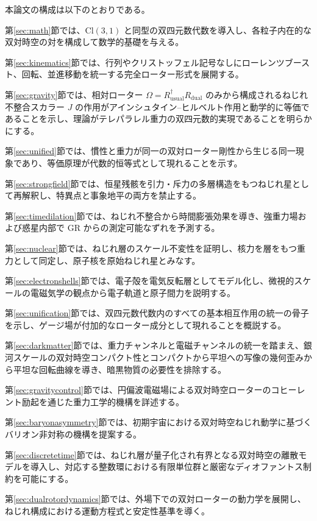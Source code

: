 \documentclass[dvipdfmx,a4paper]{article}
\begin{document}
本論文の構成は以下のとおりである。

第\ref{sec:math}節では、$\mathrm{Cl}(3,1)$ と同型の双四元数代数を導入し、各粒子内在的な双対時空の対を構成して数学的基礎を与える。

第\ref{sec:kinematics}節では、行列やクリストッフェル記号なしにローレンツブースト、回転、並進移動を統一する完全ローター形式を展開する。

第\ref{sec:gravity}節では、相対ローター $\Omega = R_\text{usual}^\dagger R_{\text{dual}}$ のみから構成されるねじれ不整合スカラー $J$ の作用がアインシュタイン--ヒルベルト作用と動学的に等価であることを示し、理論がテレパラレル重力の双四元数的実現であることを明らかにする。

第\ref{sec:unified}節では、慣性と重力が同一の双対ローター剛性から生じる同一現象であり、等価原理が代数的恒等式として現れることを示す。

第\ref{sec:strongfield}節では、恒星残骸を引力・斥力の多層構造をもつねじれ星として再解釈し、特異点と事象地平の両方を禁止する。

第\ref{sec:timedilation}節では、ねじれ不整合から時間膨張効果を導き、強重力場および惑星内部で GR からの測定可能なずれを予測する。

第\ref{sec:nuclear}節では、ねじれ層のスケール不変性を証明し、核力を層をもつ重力として同定し、原子核を原始ねじれ星とみなす。

第\ref{sec:electronshells}節では、電子殻を電気反転層としてモデル化し、微視的スケールの電磁気学の観点から電子軌道と原子間力を説明する。

第\ref{sec:unification}節では、双四元数代数内のすべての基本相互作用の統一の骨子を示し、ゲージ場が付加的なローター成分として現れることを概説する。

第\ref{sec:darkmatter}節では、重力チャンネルと電磁チャンネルの統一を踏まえ、銀河スケールの双対時空コンパクト性とコンパクトから平坦への写像の幾何歪みから平坦な回転曲線を導き、暗黒物質の必要性を排除する。

第\ref{sec:gravitycontrol}節では、円偏波電磁場による双対時空ローターのコヒーレント励起を通じた重力工学的機構を詳述する。

第\ref{sec:baryonasymmetry}節では、初期宇宙における双対時空ねじれ動学に基づくバリオン非対称の機構を提案する。

第\ref{sec:discretetime}節では、ねじれ層が量子化され有界となる双対時空の離散モデルを導入し、対応する整数環における有限単位群と厳密なディオファントス制約を可能にする。

第\ref{sec:dualrotordynamics}節では、外場下での双対ローターの動力学を展開し、ねじれ構成における運動方程式と安定性基準を導く。
\end{document}
